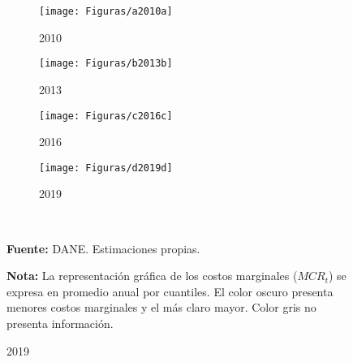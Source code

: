 \begin{figure}[H]
\caption{Costos marginales en Colombia}
\begin{subfigure}{0.22\textwidth}
  \centering
	\texttt{[image: Figuras/a2010a]} 
  \caption{2010}
  \label{A41}
\end{subfigure}
\begin{subfigure}{0.22\textwidth}
  \centering
	\texttt{[image: Figuras/b2013b]} 
  \caption{2013}
  \label{A42}
\end{subfigure}
\begin{subfigure}{0.22\textwidth}
  \centering
	\texttt{[image: Figuras/c2016c]} 
  \caption{2016}
  \label{A43}
\end{subfigure}
\begin{subfigure}{0.22\textwidth}
  \centering
	\texttt{[image: Figuras/d2019d]} 
  \caption{2019}
  \label{A44}
\end{subfigure}\\
  \raggedright  \scriptsize \textbf{Fuente:} DANE. Estimaciones propias.\\
\raggedright  \scriptsize \textbf{Nota:} La representación gráfica de los costos marginales ($MCR_{t}$) se expresa en promedio anual por cuantiles. El color oscuro presenta menores costos marginales y el más claro mayor. Color gris no presenta información.
\label{cm22}	
\end{figure}


